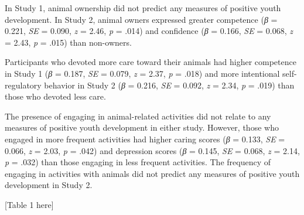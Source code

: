 \documentclass[
  jou,
  longtable,
  nolmodern,
  notxfonts,
  notimes,
  colorlinks=true,linkcolor=blue,citecolor=blue,urlcolor=blue]{apa7}
\begin{document}
In Study 1, animal ownership did not predict any measures of positive
youth development. In Study 2, animal owners expressed greater
competence (\emph{β} = 0.221, \emph{SE} = 0.090, \emph{z} = 2.46,
\emph{p} = .014) and confidence (\emph{β} = 0.166, \emph{SE} = 0.068,
\emph{z} = 2.43, \emph{p} = .015) than non-owners.

Participants who devoted more care toward their animals had higher
competence in Study 1 (\emph{β} = 0.187, \emph{SE} = 0.079, \emph{z} =
2.37, \emph{p} = .018) and more intentional self-regulatory behavior in
Study 2 (\emph{β} = 0.216, \emph{SE} = 0.092, \emph{z} = 2.34, \emph{p}
= .019) than those who devoted less care.

The presence of engaging in animal-related activities did not relate to
any measures of positive youth development in either study. However,
those who engaged in more frequent activities had higher caring scores
(\emph{β} = 0.133, \emph{SE} = 0.066, \emph{z} = 2.03, \emph{p} = .042)
and depression scores (\emph{β} = 0.145, \emph{SE} = 0.068, \emph{z} =
2.14, \emph{p} = .032) than those engaging in less frequent activities.
The frequency of engaging in activities with animals did not predict any
measures of positive youth development in Study 2.

{[}Table 1 here{]}
\end{document}
